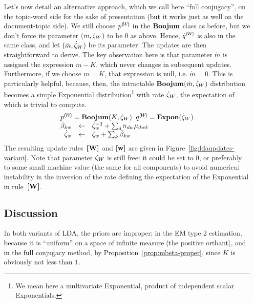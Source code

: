 Let's now detail an alternative approach, which we call here ``full conjugacy'', on the topic-word side for the sake of presentation (but it works just as well on the document-topic side). We still choose ${p}^{(\!{W}\!)}$ in the $\mathbf{Boojum}$ class as before, but we don't force its parameter $(m,\zeta_W)$ to be $0$ as above. Hence, ${\dot{q}}^{(\!{W}\!)}$ is also in the same class, and let $(\dot{m},\dot{\zeta}_W)$ be its parameter. The updates are then straightforward to derive. The key observation here is that parameter $\dot{m}$ is assigned the expression $m-K$, which never changes in subsequent updates. Furthermore, if we choose $m=K$, that expression is null, i.e. $\dot{m}=0$. This is particularly helpful, because, then, the intractable $\mathbf{Boojum}(\dot{m},\dot{\zeta}_W)$ distribution becomes a simple Exponential distribution\footnote{We mean here a multivariate Exponential, product of independent scalar Exponentials.} with rate $\dot{\zeta}_W$, the expectation of which is trivial to compute.
\[
\begin{array}{rcl}
\multicolumn{3}{c}{
\cpnt{p}{W} = \mbeta(K,\pmW_W)
\;\;
\cpnt{\dot{q}}{W} = \textbf{Expon}(\vvmW_W)
} \\
\vvmKW_{kw} & \assignn & \vvmW_w^{-1}+\sum_dn_{dw}\vvmDWK_{dwk} \\
\vvmW_w & \assignn & \pmW_w+\sum_k\vvmbKW_{kw}
\end{array}
\]
The resulting update rules~$\textbf{[W]}$ and  $\textbf{[w]}$ are given in Figure~\ref{fig:ldaupdates-variant}. Note that parameter $\zeta_W$ is still free: it could be set to $0$, or preferably to some small machine value (the same for all components) to avoid numerical instability in the inversion of the rate defining the expectation of the Exponential in rule~$\textbf{[W]}$.
\subsection{Discussion}
In both variants of LDA, the priors are improper: in the EM type 2 estimation, because it is ``uniform'' on a space of infinite measure (the positive orthant), and in the full conjugacy method, by Proposition~\ref{prop:mbeta-proper}, since $K$ is obviously not less than $1$.

